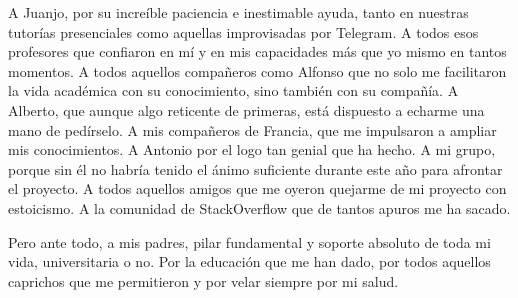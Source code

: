        \vspace{1cm}

A Juanjo, por su increíble paciencia e inestimable ayuda, tanto en nuestras tutorías presenciales como aquellas improvisadas por Telegram. A todos esos profesores que confiaron en mí y en mis capacidades más que yo mismo en tantos momentos. A todos aquellos compañeros como Alfonso que no solo me facilitaron la vida académica con su conocimiento, sino también con su compañía. A Alberto, que aunque algo reticente de primeras, está dispuesto a echarme una mano de pedírselo. A mis compañeros de Francia, que me impulsaron a ampliar mis conocimientos. A Antonio por el logo tan genial que ha hecho. A mi grupo, porque sin él no habría tenido el ánimo suficiente durante este año para afrontar el proyecto. A todos aquellos amigos que me oyeron quejarme de mi proyecto con estoicismo. A la comunidad de StackOverflow que de tantos apuros me ha sacado.

Pero ante todo, a mis padres, pilar fundamental y soporte absoluto de toda mi vida, universitaria o no. Por la educación que me han dado, por todos aquellos caprichos que me permitieron y por velar siempre por mi salud.